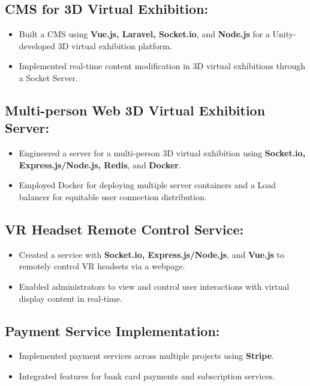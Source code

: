 \documentclass{resume}
\begin{document}
{\small\subsection*{CMS for 3D Virtual Exhibition:}}
\begin{itemize}[noitemsep]
    \item Built a CMS using \textbf{Vue.js, Laravel, Socket.io}, and \textbf{Node.js} for a Unity-developed 3D virtual exhibition platform.
    \item Implemented real-time content modification in 3D virtual exhibitions through a Socket Server.
\end{itemize}
{\small\subsection*{Multi-person Web 3D Virtual Exhibition Server:}}
\begin{itemize}[noitemsep]
    \item Engineered a server for a multi-person 3D virtual exhibition using \textbf{Socket.io, Express.js/Node.js, Redis}, and \textbf{Docker}.
    \item Employed Docker for deploying multiple server containers and a Load balancer for equitable user connection distribution.
\end{itemize}
{\small\subsection*{VR Headset Remote Control Service:}}
\begin{itemize}[noitemsep]
    \item Created a service with \textbf{Socket.io, Express.js/Node.js}, and \textbf{Vue.js} to remotely control VR headsets via a webpage.
    \item Enabled administrators to view and control user interactions with virtual display content in real-time.
\end{itemize}
{\small\subsection*{Payment Service Implementation:}}
\begin{itemize}[noitemsep]
    \item Implemented payment services across multiple projects using \textbf{Stripe}.
    \item Integrated features for bank card payments and subscription services.
\end{itemize}
\end{document}

